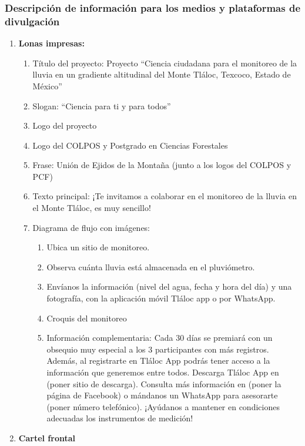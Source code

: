 \subsubsection*{Descripción de información para los medios y plataformas de divulgación}

\begin{enumerate}
    \item \textbf{Lonas impresas:}
    \begin{enumerate}
        \item Título del proyecto:
        Proyecto ``Ciencia ciudadana para el monitoreo de la lluvia en un gradiente altitudinal del Monte Tláloc, Texcoco, Estado de México”
        \item	Slogan: 
        ``Ciencia para ti y para todos''
        \item Logo del proyecto
        \item Logo del COLPOS y Postgrado en Ciencias Forestales
        \item Frase: Unión de Ejidos de la Montaña (junto a los logos del COLPOS y PCF)
        \item Texto principal: ¡Te invitamos a colaborar en el monitoreo de la lluvia en el Monte Tláloc, es muy sencillo!
        \item Diagrama de flujo con imágenes: \begin{enumerate}
            \item Ubica un sitio de monitoreo.
            \item Observa cuánta lluvia está almacenada en el pluviómetro.
            \item Envíanos la información (nivel del agua, fecha y hora del día) y una fotografía, con la aplicación móvil Tláloc app o por WhatsApp.
            \item Croquis del monitoreo
            \item Información complementaria: Cada 30 días se premiará con un obsequio muy especial a los 3 participantes con más registros. Además, al            registrarte en Tláloc App podrás tener acceso a la información que            generemos entre todos. Descarga Tláloc App en (poner sitio de descarga). Consulta más información en (poner la página de Facebook) o mándanos un WhatsApp para asesorarte (poner número telefónico). ¡Ayúdanos a mantener en condiciones adecuadas los instrumentos de
            medición!
        \end{enumerate}
    \end{enumerate}
    \item \textbf{Cartel frontal} \begin{enumerate}

\end{enumerate}
\end{enumerate}
